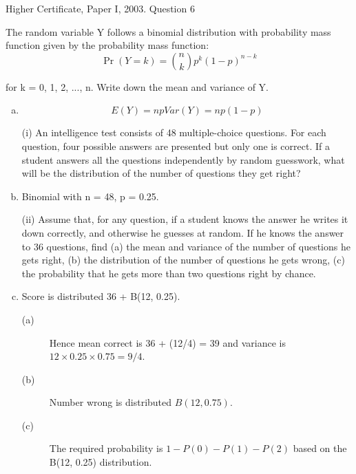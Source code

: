\documentclass[a4paper,12pt]{article}
\begin{document}
Higher Certificate, Paper I, 2003. Question 6
\begin{framed}
The random variable Y follows a binomial distribution with probability mass function
given by
the probability mass function: 
\[{\displaystyle \Pr(Y=k)={\binom {n}{k}}p^{k}(1-p)^{n-k}} \]

for k = 0, 1, 2, ..., n.
Write down the mean and variance of Y.
\end{framed}

\begin{enumerate}[(a)]
\item 
\[E(Y) = np Var(Y) = np(1 - p)\]

\begin{framed}
(i) An intelligence test consists of 48 multiple-choice questions. For each
question, four possible answers are presented but only one is correct. If a
student answers all the questions independently by random guesswork, what
will be the distribution of the number of questions they get right?
\end{framed}




\item Binomial with n = 48, p = 0.25.



\newpage
\begin{framed}
(ii) Assume that, for any question, if a student knows the answer he writes it down
correctly, and otherwise he guesses at random. If he knows the answer to 36
questions, find
(a) the mean and variance of the number of questions he gets right,
(b) the distribution of the number of questions he gets wrong,
(c) the probability that he gets more than two questions right by chance.
\end{framed}


\item Score is distributed 36 + B(12, 0.25).

\begin{description}
\item[(a)] Hence mean correct is 36 + (12/4) = 39 and variance is $12 \times 0.25 \times 0.75 = 9/4$.
\item[(b)] Number wrong is distributed $B(12, 0.75)$.
\item[(c)] The required probability is $1 - P(0) - P(1) - P(2)$ based on the B(12, 0.25)
distribution. 
\end{description}


\end{enumerate}
\end{document}
